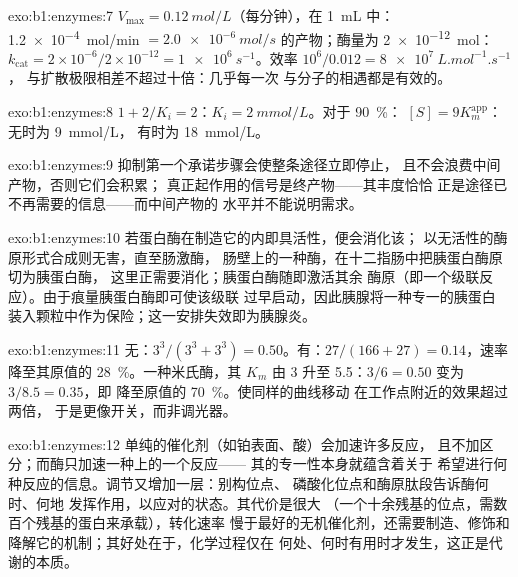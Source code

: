 \begin{solution}{exo:b1:enzymes:7}
$V_{\max} = \qty{0.12}{mol/L}$（每分钟），在 \qty{1}{mL} 中：
\qty{1.2e-4}{mol/min} $= \qty{2.0e-6}{mol/s}$ 的产物；酶量为
\qty{2e-12}{mol}：$k_{\text{cat}} = 2\times 10^{-6}/2\times 10^{-12} =
\qty{1e6}{s^{-1}}$。效率 $10^6/0.012 = \qty{8e7}{L.mol^{-1}.s^{-1}}$，
与扩散极限相差不超过十倍：几乎每一次
与分子的相遇都是有效的。
\end{solution}

\begin{solution}{exo:b1:enzymes:8}
$1 + 2/K_i = 2$：$K_i = \qty{2}{mmol/L}$。对于 \qty{90}{\%}：
$[S] = 9K_m^{\text{app}}$：无时为 \qty{9}{mmol/L}，
有时为 \qty{18}{mmol/L}。
\end{solution}

\begin{solution}{exo:b1:enzymes:9}
抑制第一个承诺步骤会使整条途径立即停止，
且不会浪费中间产物，否则它们会积累；
真正起作用的信号是终产物——其丰度恰恰
正是途径已不再需要的信息——而中间产物的
水平并不能说明需求。
\end{solution}

\begin{solution}{exo:b1:enzymes:10}
若蛋白酶在制造它的内即具活性，便会消化该；
以无活性的酶原形式合成则无害，直至肠激酶，
肠壁上的一种酶，在十二指肠中把胰蛋白酶原切为胰蛋白酶，
这里正需要消化；胰蛋白酶随即激活其余
酶原（即一个级联反应）。由于痕量胰蛋白酶即可使该级联
过早启动，因此胰腺将一种专一的胰蛋白
装入颗粒中作为保险；这一安排失效即为胰腺炎。
\end{solution}

\begin{solution}{exo:b1:enzymes:11}
无：$3^3/(3^3 + 3^3) = 0.50$。有：$27/(166 + 27) = 0.14$，速率
降至其原值的 \qty{28}{\%}。一种米氏酶，其
$K_m$ 由 3 升至 5.5：$3/6 = 0.50$ 变为 $3/8.5 = 0.35$，即
降至原值的 \qty{70}{\%}。使同样的曲线移动
在工作点附近的效果超过两倍，
于是更像开关，而非调光器。
\end{solution}

\begin{solution}{exo:b1:enzymes:12}
单纯的催化剂（如铂表面、酸）会加速许多反应，
且不加区分；而酶只加速一种上的一个反应——
其的专一性本身就蕴含着关于
希望进行何种反应的信息。调节又增加一层：别构位点、
磷酸化位点和酶原肽段告诉酶何时、何地
发挥作用，以应对的状态。其代价是很大
（一个十余残基的位点，需数百个残基的蛋白来承载），转化速率
慢于最好的无机催化剂，还需要制造、修饰和
降解它的机制；其好处在于，化学过程仅在
何处、何时有用时才发生，这正是代谢的本质。
\end{solution}

